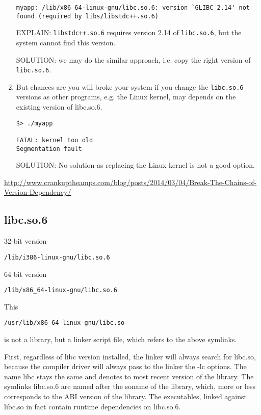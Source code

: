 \begin{enumerate}
\begin{verbatim}
myapp: /lib/x86_64-linux-gnu/libc.so.6: version `GLIBC_2.14' not found (required by libs/libstdc++.so.6)
\end{verbatim}  
EXPLAIN: \verb!libstdc++.so.6! requires version 2.14 of \verb!libc.so.6!, but the system cannot find this version.

SOLUTION: we may do the similar approach, i.e. copy the right version of
\verb!libc.so.6!.


   \item But chances are you will broke your system if you change the
   \verb!libc.so.6!
versions as other programs, e.g. the Linux kernel, may depends on the existing
version of libc.so.6.

\begin{verbatim}
$> ./myapp  

FATAL: kernel too old  
Segmentation fault
\end{verbatim}
SOLUTION: No solution as replacing the Linux kernel is not a good option.
  
\end{enumerate}
\url{http://www.crankuptheamps.com/blog/posts/2014/03/04/Break-The-Chains-of-Version-Dependency/}

\subsection{libc.so.6}

32-bit version
\begin{verbatim}
/lib/i386-linux-gnu/libc.so.6
\end{verbatim}

64-bit version
\begin{verbatim}
/lib/x86_64-linux-gnu/libc.so.6
\end{verbatim}

This 
\begin{verbatim}
/usr/lib/x86_64-linux-gnu/libc.so
\end{verbatim}
 is not a library, but a linker script file, which refers to the above symlinks.
 
 
 First, regardless of libc version installed, the linker will always search for
 libc.so, because the compiler driver will always pass to the linker the -lc
 options. The name libc stays the same and denotes to most recent version of the
 library. The symlinks libc.so.6 are named after the soname of the library,
 which, more or less corresponds to the ABI version of the library. The
 executables, linked against libc.so in fact contain runtime dependencies on
 libc.so.6.

